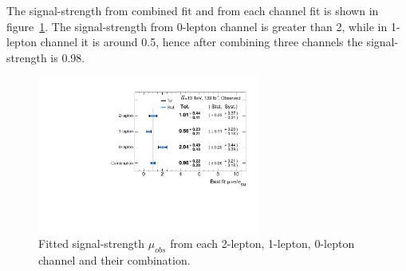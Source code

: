 The signal-strength from combined fit and from each channel fit is shown in figure~\ref{fig:muhat}.
The signal-strength from 0-lepton channel is greater than 2, while in 1-lepton channel it is around 0.5, hence after combining three channels the signal-strength is 0.98.
\begin{figure}[]
      \centering
        \includegraphics[width=0.65\textwidth]{figures/Muhat_channels}
        \caption{Fitted signal-strength $\mu_{obs}$ from each 2-lepton, 1-lepton, 0-lepton channel and their combination.}
       \label{fig:muhat}
\end{figure}

